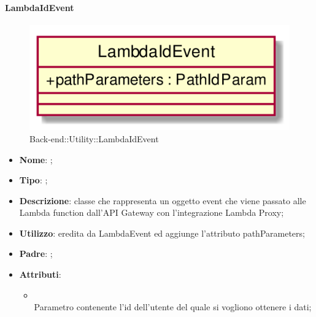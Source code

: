 \hypertarget{LambdaIdEvent_label}{\paragraph{LambdaIdEvent}}
\begin{figure}[h]
	\centering
	\includegraphics[width=\textwidth,height=\textheight,keepaspectratio]{images/ClassLambdaIdEvent.png}
	\caption{Back-end::Utility::LambdaIdEvent}
\end{figure}
\begin{itemize}
	\item \textbf{Nome}: ;
	\item \textbf{Tipo}: ;
	\item \textbf{Descrizione}: classe che rappresenta un oggetto event che viene passato alle Lambda function dall'API Gateway con l'integrazione Lambda Proxy;
	\item \textbf{Utilizzo}: eredita da LambdaEvent ed aggiunge l'attributo pathParameters;
	\item \textbf{Padre}: ;
	\item \textbf{Attributi}:
	\begin{itemize}
		\item[]  \\
		Parametro contenente l'id dell'utente del quale si vogliono ottenere i dati;
	\end{itemize}
\end{itemize}
\FloatBarrier

